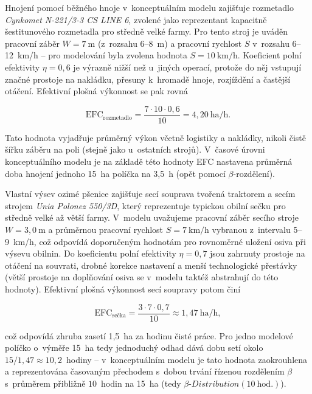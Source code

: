 \documentclass[11pt,a4paper]{article}
\newcounter{subsubsubsection}[subsubsection]
\begin{document}

Hnojení pomocí běžného hnoje v~konceptuálním modelu zajišťuje rozmetadlo \emph{Cynkomet N-221/3-3 CS LINE 6}\cite{eshop-zp-rozmetadlo-hnoje}, zvolené jako reprezentant kapacitně šestitunového rozmetadla pro středně velké farmy. Pro tento stroj je uváděn pracovní záběr $W = 7~\text{m}$ (z~rozsahu 6--8~m) a pracovní rychlost $S$ v~rozsahu 6--12~km/h -- pro modelování byla zvolena hodnota $S = 10~\text{km/h}$. Koeficient polní efektivity $\eta = 0,6$ je výrazně nižší než u~jiných operací, protože do něj vstupují značné prostoje na nakládku, přesuny k~hromadě hnoje, rozjíždění a častější otáčení. Efektivní plošná výkonnost se pak rovná

$$
\text{EFC}_{\text{rozmetadlo}} = \frac{7 \cdot 10 \cdot 0,6}{10} = 4,20~\text{ha/h}.
$$

Tato hodnota vyjadřuje průměrný výkon včetně logistiky a nakládky, nikoli čistě šířku záběru na poli (stejně jako u~ostatních strojů). V~časové úrovni konceptuálního modelu je na základě této hodnoty EFC nastavena průměrná doba hnojení jednoho 15~ha políčka na 3,5~h (opět pomocí $\beta$-rozdělení).


Vlastní výsev ozimé pšenice zajišťuje secí souprava tvořená traktorem a secím strojem \emph{Unia Polonez 550/3D}\cite{eshop-zp-secí-stroj}, který reprezentuje typickou obilní sečku pro středně velké  až větší farmy. V~modelu uvažujeme pracovní záběr secího stroje $W = 3,0~\text{m}$ a průměrnou pracovní rychlost $S = 7~\text{km/h}$ vybranou z~intervalu 5--9~km/h, což odpovídá doporučeným hodnotám pro rovnoměrné uložení osiva při výsevu obilnin. Do koeficientu polní efektivity $\eta = 0,7$ jsou zahrnuty prostoje na otáčení na souvrati, drobné korekce nastavení a menší technologické přestávky (větší prostoje na doplňování osiva se v~modelu taktéž abstrahují do této hodnoty). Efektivní plošná výkonnost secí soupravy potom činí

$$
\text{EFC}_{\text{sečka}} = \frac{3 \cdot 7 \cdot 0,7}{10} \approx 1,47~\text{ha/h},
$$

což odpovídá zhruba zasetí 1,5~ha za hodinu čisté práce. Pro jedno modelové políčko o~výměře 15~ha tedy jednoduchý odhad dává dobu setí okolo $15/1,47 \approx 10,2$~hodiny -- v~konceptuálním modelu je tato hodnota zaokrouhlena a reprezentována časovaným přechodem s~dobou trvání řízenou rozdělením $\beta$ s~průměrem přibližně $10$~hodin na 15~ha (tedy $\beta\text{-}Distribution(10~\text{hod.})$).
\end{document}
